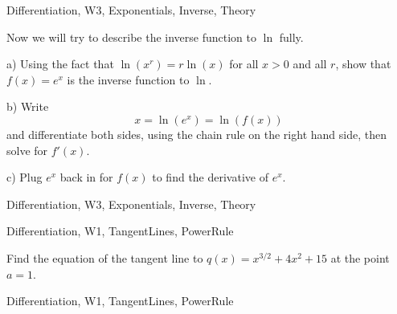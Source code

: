 
\begin{tagblock}{Differentiation, W3, Exponentials, Inverse, Theory}
\begin{question}
	Now we will try to describe the inverse function to $\ln$ fully. 

\bigskip

a) Using the fact that $\ln(x^r)=r\ln(x)$ for all $x>0$ and all $r$, show that $f(x)=e^x$ is the inverse function to $\ln$.  

\bigskip


b) Write 
\[
x=\ln(e^x)=\ln(f(x))
\]
and differentiate both sides, using the chain rule on the right hand side, then solve for $f'(x)$.

\bigskip

c) Plug $e^x$ back in for $f(x)$ to find the derivative of $e^x$. 
	
	
\begin{tags}
	    Differentiation, W3, Exponentials, Inverse, Theory
\end{tags}
	
\begin{diary}
\end{diary}
	
\begin{solution}
	   
\end{solution}
	
\end{question}

\end{tagblock}


\begin{tagblock}{Differentiation, W1, TangentLines, PowerRule}
\begin{question}
	

\bigskip

Find the equation of the tangent line to $q(x)=x^{3/2}+4x^2+15$ at the point $a=1$.

\bigskip


	
	
\begin{tags}
	    Differentiation, W1, TangentLines, PowerRule
\end{tags}
	
\begin{diary}
\end{diary}
	
\begin{solution}
	   
\end{solution}
	
\end{question}

\end{tagblock}

